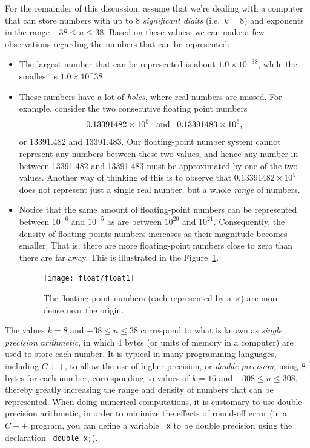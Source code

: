 For the remainder of this discussion, assume that we're dealing with a
computer that can store numbers with up to 8 \emph{ significant digits}
(i.e.~$k=8$) and exponents in the range $-38 \leq n \leq 38$.
Based on these values, we can make a few observations regarding the
numbers that can be represented:
\begin{itemize}
\item The largest number that can be represented is about $1.0\times
  10^{+38}$, while the smallest is $1.0\times 10^-38$.  
\item These numbers have a lot of \emph{ holes}, where real numbers are
  missed.  For example, consider the two consecutive floating point
  numbers 
  \[
  0.13391482 \times 10^5 \;\;\; {\rm and} \;\;\; 0.13391483 \times 10^5,
  \]
  or 13391.482 and 13391.483.  Our floating-point number system cannot
  represent any numbers between these two values, and hence any number
  in between 13391.482 and 13391.483 must be approximated by one of the
  two values.  Another way of thinking of this is to observe that 
  $0.13391482 \times 10^5$ does not represent just a single real number,
  but a whole \emph{ range} of numbers. 
\item Notice that the same amount of floating-point numbers can be
  represented between $10^{-6}$ and $10^{-5}$ as are between $10^{20}$
  and $10^{21}$.  Consequently, the density of floating points numbers
  increases as their magnitude becomes smaller.  That is, there are
  more floating-point numbers close to zero than there are far away.
  This is illustrated in the Figure~\ref{lab2:fig:float}.
  \begin{figure}[htbp]
    \begin{center}
      \leavevmode
      \texttt{[image: float/float1]}
      \caption{The floating-point numbers (each represented by a
        $\times$) are more dense near the origin.} 
      \label{lab2:fig:float}
    \end{center}
  \end{figure}
\end{itemize}
 
The values $k=8$ and $-38\leq n \leq 38$ correspond to what is known
as \emph{ single precision arithmetic}, in which 4 bytes (or units of
memory in a computer) are used to store each number.  It is typical in
many programming languages, including $C++$, to allow the use of higher
precision, or \emph{ double precision}, using 8 bytes for each number,
corresponding to values of $k=16$ and $-308\leq n \leq 308$, thereby
greatly increasing the range and density of numbers that can be 
represented.  When doing numerical computations, it is customary to
use double-precision arithmetic, in order to minimize the effects of
round-off error (in a $C++$ program, you can define a
variable \texttt{ x} to be double precision using the declaration \texttt{
  double x;}). 

